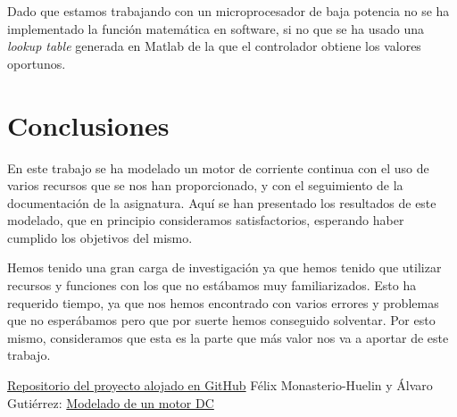 \documentclass[a4paper]{article}
\begin{document}
Dado que estamos trabajando con un microprocesador de baja potencia no se ha implementado la función matemática en software, si no que se ha usado una \emph{lookup table} generada
en Matlab de la que el controlador obtiene los valores oportunos.

\section{Conclusiones}
En este trabajo se ha modelado un motor de corriente continua con el uso de varios recursos que se nos han proporcionado, y con el seguimiento de la documentación de la asignatura. Aquí se han presentado los
resultados de este modelado, que en principio consideramos satisfactorios, esperando haber cumplido los objetivos del mismo.

Hemos tenido una gran carga de investigación ya que hemos tenido que utilizar recursos y funciones con los que no estábamos muy familiarizados. Esto ha requerido tiempo, ya que nos hemos
encontrado con varios errores y problemas que no esperábamos pero que por suerte hemos conseguido solventar. Por esto mismo, consideramos que esta es la parte que más valor nos va a aportar de
este trabajo.


\begin{thebibliography}{9}
 \href{https://github.com/jjalberca/reallabo2018}{Repositorio del proyecto alojado en GitHub}
 Félix Monasterio-Huelin y Álvaro Gutiérrez: \href{http://robolabo.etsit.upm.es/asignaturas/seco/apuntes/modelado.pdf}{Modelado de un motor DC}
\end{thebibliography}
\end{document}
